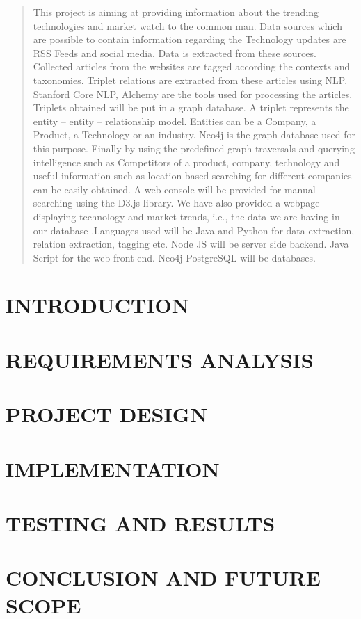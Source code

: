\documentclass[12pt]{report}
\begin{document}
\begin{abstract}
This project is aiming at providing information about the trending technologies and market watch to the common man. Data sources which are possible to contain information regarding the Technology updates are RSS Feeds and social media. Data is extracted from these sources. Collected articles from the websites are tagged according the contexts and taxonomies. Triplet relations are extracted from these articles using NLP. Stanford Core NLP, Alchemy are the tools used for processing the articles. Triplets obtained will be put in a graph database. A triplet represents the entity – entity – relationship model. Entities can be a Company, a Product, a Technology or an industry. Neo4j is the graph database used for this purpose. Finally by using the predefined graph traversals and querying intelligence such as Competitors of a product, company, technology and useful information such as location based searching for different companies can be easily obtained. A web console will be provided for manual searching using the D3.js library. We have also provided a webpage displaying technology and market trends, i.e., the data we are having in our database .Languages used will be Java and Python for data extraction, relation extraction, tagging etc. Node JS will be server side backend. Java Script for the web front end. Neo4j  PostgreSQL will be databases.
\end{abstract}

\clearpage
{}
\tableofcontents		
\listoffigures

\chapter{INTRODUCTION}


\chapter{REQUIREMENTS ANALYSIS}


\chapter{PROJECT DESIGN}


\chapter{IMPLEMENTATION}


\chapter{TESTING AND RESULTS}


\chapter{CONCLUSION AND FUTURE SCOPE}

\end{document}
